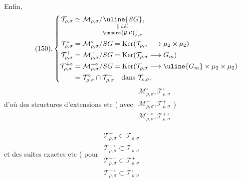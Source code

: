 Enfin, 
\[
\tag*{(150).}
\left\{\begin{aligned}
\mathcal{T}_{\rho,\sigma}&\simeq
\mathcal{M}_{\rho,\sigma}/
\underset{\substack{\Vert\,\mathrm{d\acute ef}\\\unsure{\mathcal{G}|\mathcal{C}}_{\rho,\sigma}^{+}}}{\uline{SG}},\\
\mathcal{T}_{\rho,\sigma}^{\circ}&=
\mathcal{M}_{\rho,\sigma}^{\circ}/SG
=\operatorname{Ker}(\mathcal{T}_{\rho,\sigma}\longrightarrow\mu_2\times\mu_2)\\
\mathcal{T}_{\rho,\sigma}^{+}&=
\mathcal{M}_{\rho,\sigma}^{+}/SG
=\operatorname{Ker}(\mathcal{T}_{\rho,\sigma}\longrightarrow G_m)\\
\mathcal{T}_{\rho,\sigma}^{+\circ}&=
\mathcal{M}_{\rho,\sigma}^{+\circ}/SG
=\operatorname{Ker}(\mathcal{T}_{\rho,\sigma}\longrightarrow\uline{G_m}\times\mu_2\times\mu_2)\\
&=\mathcal{T}_{\rho,\sigma}^{\circ}\cap\mathcal{T}_{\rho,\sigma}^{+}
\quad\text{dans }\mathcal{T}_{\rho,\sigma},
\end{aligned}\right.
\]
d'où des structures d'extensions
etc ( avec
$\begin{array}{l}
\mathcal{M}_{\rho,\sigma}^{\circ},\mathcal{T}_{\rho,\sigma}^{\circ}\\
\mathcal{M}_{\rho,\sigma}^{+},\mathcal{T}_{\rho,\sigma}^{+}\\
\mathcal{M}_{\rho,\sigma}^{+\circ},\mathcal{T}_{\rho,\sigma}^{+\circ}
\end{array}$)

et des suites exactes
etc ( pour
$\begin{array}{l}
\mathcal{T}_{\rho,\sigma}^{+}\subset\mathcal{T}_{\rho,\sigma}\\
\mathcal{T}_{\rho,\sigma}^{+\circ}\subset\mathcal{T}_{\rho,\sigma}\\
\mathcal{T}_{\rho,\sigma}^{+\circ}\subset\mathcal{T}_{\rho,\sigma}^{+}\\
\mathcal{T}_{\rho,\sigma}^{+\circ}\subset\mathcal{T}_{\rho,\sigma}^{\circ}
\end{array}$

